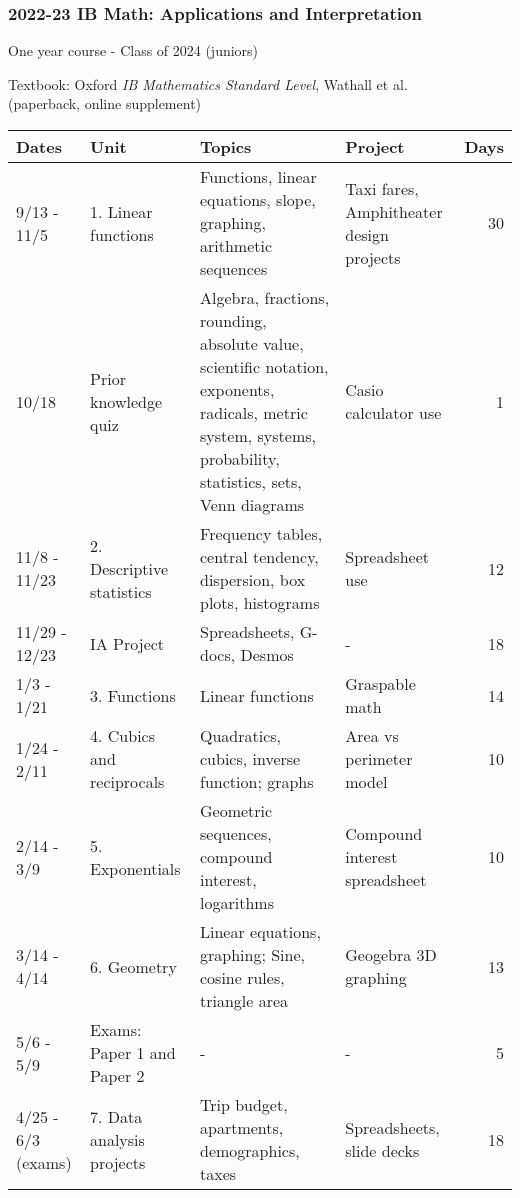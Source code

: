 \documentclass[12pt, twoside]{article}
\begin{document}
\subsubsection*{2022-23 IB Math: Applications and Interpretation} 
One year course - Class of 2024 (juniors) \par
Textbook: Oxford \emph{IB Mathematics Standard Level}, Wathall et al. \\
(paperback, online supplement) \par \medskip
\begin{tabular}{|p{2.4cm}|p{5.5cm}|p{8cm}|p{4cm}|r|}
  \hline
  Dates & Unit & Topics  & Project & Days \\
  \hline
  9/13 - 11/5 & 1. Linear functions & Functions, linear equations, slope, graphing, arithmetic sequences & Taxi fares, Amphitheater design projects & 30 \\
  \hline
  10/18 & Prior knowledge quiz & Algebra, fractions, rounding, absolute value, scientific notation, exponents, radicals, metric system, systems, probability, statistics, sets, Venn diagrams & Casio calculator use & 1 \\
  \hline
  11/8 - 11/23 & 2. Descriptive statistics & Frequency tables, central tendency, dispersion, box plots, histograms & Spreadsheet use & 12 \\
  \hline
  11/29 - 12/23 & IA Project & Spreadsheets, G-docs, Desmos & - & 18 \\
  \hline
  1/3 - 1/21 & 3. Functions & Linear functions & Graspable math & 14 \\
  \hline
  1/24 - 2/11 & 4. Cubics and reciprocals & Quadratics, cubics, inverse function; graphs & Area vs perimeter model & 10 \\
  \hline
  2/14 - 3/9 & 5. Exponentials & Geometric sequences, compound interest, logarithms & Compound interest spreadsheet & 10 \\
  \hline
  3/14 - 4/14 & 6. Geometry & Linear equations, graphing; Sine, cosine rules, triangle area & Geogebra 3D graphing & 13 \\
  \hline
  5/6 - 5/9 & Exams: Paper 1 and Paper 2 & - & - & 5 \\
  \hline
  4/25 - 6/3 (exams) & 7. Data analysis projects & Trip budget, apartments, demographics, taxes & Spreadsheets, slide decks & 18 \\
  \hline
\end{tabular}

\newpage
\end{document}
